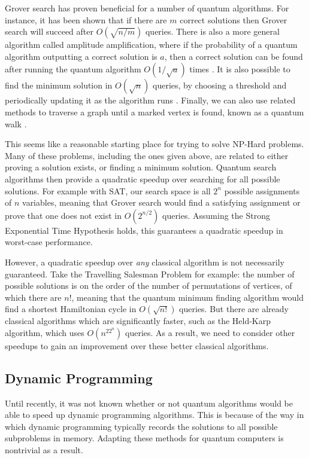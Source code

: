 Grover search has proven beneficial for a number of quantum algorithms. For instance, it has been shown that if there are $m$ correct solutions then Grover search will succeed after $O(\sqrt{n/m})$ queries. There is also a more general algorithm called amplitude amplification, where if the probability of a quantum algorithm outputting a correct solution is $a$, then a correct solution can be found after running the quantum algorithm $O(1/\sqrt{a})$ times \cite{brassard2002}. It is also possible to find the minimum solution in $O(\sqrt{n})$ queries, by choosing a threshold and periodically updating it as the algorithm runs \cite{durr1996}. Finally, we can also use related methods to traverse a graph until a marked vertex is found, known as a quantum walk \cite{childs2003}.

This seems like a reasonable starting place for trying to solve NP-Hard problems. Many of these problems, including the ones given above, are related to either proving a solution exists, or finding a minimum solution. Quantum search algorithms then provide a quadratic speedup over searching for all possible solutions. For example with SAT, our search space is all $2^n$ possible assignments of $n$ variables, meaning that Grover search would find a satisfying assignment or prove that one does not exist in $O(2^{n/2})$ queries. Assuming the Strong Exponential Time Hypothesis holds, this guarantees a quadratic speedup in worst-case performance.

However, a quadratic speedup over \textit{any} classical algorithm is not necessarily guaranteed. Take the Travelling Salesman Problem for example: the number of possible solutions is on the order of the number of permutations of vertices, of which there are $n!$, meaning that the quantum minimum finding algorithm would find a shortest Hamiltonian cycle in $O(\sqrt{n!})$ queries. But there are already classical algorithms which are significantly faster, such as the Held-Karp algorithm, which uses $O(n^22^n)$ queries. As a result, we need to consider other speedups to gain an improvement over these better classical algorithms.

\subsection{Dynamic Programming}
\label{ssec:q-dynamic}

Until recently, it was not known whether or not quantum algorithms would be able to speed up dynamic programming algorithms. This is because of the way in which dynamic programming typically records the solutions to all possible subproblems in memory. Adapting these methods for quantum computers is nontrivial as a result.

